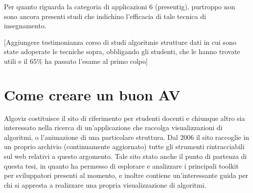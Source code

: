 Per quanto riguarda la categoria di applicazioni 6 (presentig), purtroppo
non sono ancora presenti studi che indichino l'efficacia di tale tecnica
di insegnamento.

{[}Aggiungere testimonianza corso di studi algoritmie strutture dati
in cui sono state adoperate le tecniche sopra, obbligando gli studenti,
che le hanno trovate utili e il 65\% ha passato l'esame al primo colpo{]}


\section{Come creare un buon AV}

Algoviz \cite{wikiAlgoViz} costituisce il sito di riferimento per
studenti docenti e chiunque altro sia interessato nella ricerca di
un'applicazione che raccolga visualizzazioni di algoritmi, o l'animazione
di una particolare struttura. Dal 2006 il sito raccoglie in un proprio
archivio (continuamente aggiornato) tutte gli strumenti rintracciabili
sul web relativi a questo argomento. Tale sito stato anche il punto
di partenza di questa tesi, in quanto ha permesso di esplorare e analizzare
i principali toolkit per sviluppatori presenti al momento, e inoltre
contiene un'interessante guida per chi si appresta a realizzare una
propria visualizzazione di algoritmi.

